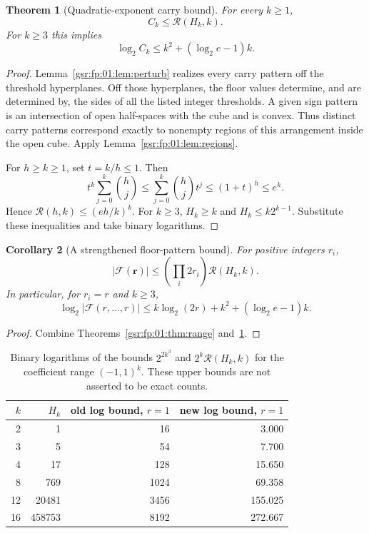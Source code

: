 \documentclass[11pt,letterpaper]{article}
\numberwithin{equation}{section}
\newtheorem{theorem}{Theorem}[section]
\newtheorem{corollary}[theorem]{Corollary}
\theoremstyle{definition}
\theoremstyle{remark}
\newcommand{\1}{\mathbf 1}
\newcommand{\RR}[2]{\mathcal R(#1,#2)}
\begin{document}
\begin{theorem}[Quadratic-exponent carry bound]\label{gsr:fp:01:thm:carryupper}
For every $k\ge1$,
\begin{equation}\label{gsr:fp:01:eq:carryupper}
 C_k\le\RR{H_k}{k}.
\end{equation}
For $k\ge3$ this implies
\begin{equation}\label{gsr:fp:01:eq:logupper}
 \log_2 C_k\le k^2+(\log_2 e-1)k.
\end{equation}
\end{theorem}
\begin{proof}
Lemma~\ref{gsr:fp:01:lem:perturb} realizes every carry pattern off the threshold
hyperplanes. Off those hyperplanes, the floor values determine, and are
determined by, the sides of all the listed integer thresholds. A given
sign pattern is an intersection of open half-spaces with the cube and is
convex. Thus distinct carry patterns correspond exactly to nonempty
regions of this arrangement inside the open cube. Apply
Lemma~\ref{gsr:fp:01:lem:regions}.

For $h\ge k\ge1$, set $t=k/h\le1$. Then
\[
 t^k\sum_{j=0}^k\binom hj
 \le\sum_{j=0}^k\binom hjt^j
 \le(1+t)^h\le e^k.
\]
Hence $\RR{h}{k}\le(eh/k)^k$. For $k\ge3$, $H_k\ge k$ and
$H_k\le k2^{k-1}$. Substitute these inequalities and take binary logarithms.
\end{proof}

\begin{corollary}[A strengthened floor-pattern bound]\label{gsr:fp:01:cor:floorimproved}
For positive integers $r_i$,
\[
 |\mathcal F(\mathbf r)|
 \le\left(\prod_i2r_i\right)\RR{H_k}{k}.
\]
In particular, for $r_i=r$ and $k\ge3$,
\begin{equation}\label{gsr:fp:01:eq:floorbits}
 \log_2|\mathcal F(r,\ldots,r)|
 \le k\log_2(2r)+k^2+(\log_2 e-1)k.
\end{equation}
\end{corollary}
\begin{proof}
Combine Theorems~\ref{gsr:fp:01:thm:range} and~\ref{gsr:fp:01:thm:carryupper}.
\end{proof}

\begin{table}[htbp]
\centering
\begin{tabular}{rrrr}
\toprule
$k$ & $H_k$ & old log bound, $r=1$ & new log bound, $r=1$\\
\midrule
2 & 1 & 16 & 3.000\\
3 & 5 & 54 & 7.700\\
4 & 17 & 128 & 15.650\\
8 & 769 & 1024 & 69.358\\
12 & 20481 & 3456 & 155.025\\
16 & 458753 & 8192 & 272.667\\
\bottomrule
\end{tabular}
\caption{Binary logarithms of the bounds $2^{2k^3}$ and
$2^k\RR{H_k}{k}$ for the coefficient range $(-1,1)^k$.
These upper bounds are not asserted to be exact counts.}\label{gsr:fp:01:tab:entropy}
\end{table}
\end{document}
